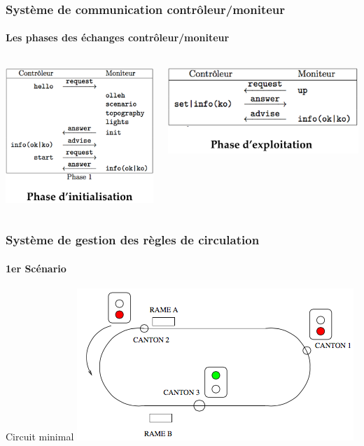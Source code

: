 
\begin{frame}
  \frametitle{Système de communication contrôleur/moniteur}
  \framesubtitle{Les phases des échanges contrôleur/moniteur}
  \begin{columns}[t]
    \begin{column}{0.5\textwidth}
      \includegraphics[scale=0.40]{include/phaseInit.png}
    \end{column}
    \begin{column}{0.5\textwidth}
      \includegraphics[scale=0.40]{include/phaseExpl.png}
    \end{column}
  \end{columns}
\end{frame}


\begin{frame}
  \frametitle{Système de gestion des règles de circulation}
  \framesubtitle{1er Scénario}
  Circuit minimal
  \vspace{1em}
  \includegraphics[scale=0.70]{include/scenario1.png}
\end{frame}

